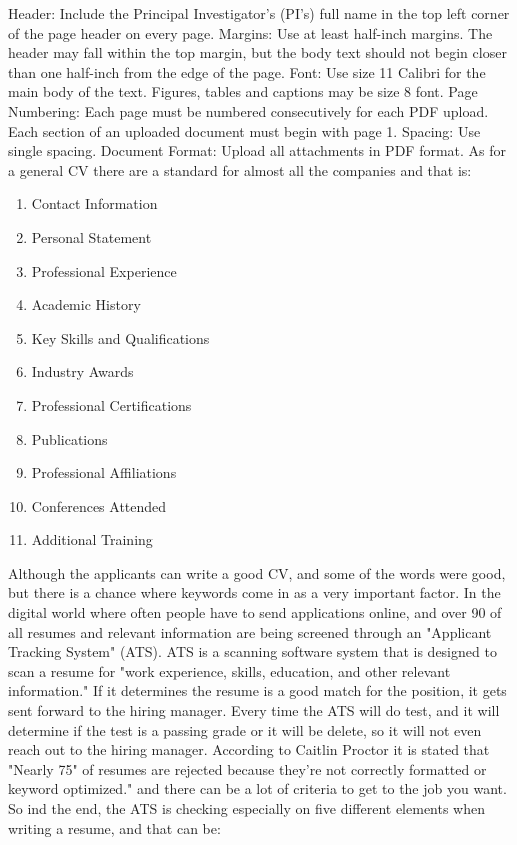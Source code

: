 Header: Include the Principal Investigator’s (PI’s) full name in the top left corner of the page header on every page.
Margins: Use at least half-inch margins. The header may fall within the top margin, but the body text should not begin closer than one half-inch from the edge of the page.
Font: Use size 11 Calibri for the main body of the text. Figures, tables and captions may be size 8 font.
Page Numbering: Each page must be numbered consecutively for each PDF upload. Each section of an uploaded document must begin with page 1.
Spacing: Use single spacing.
Document Format: Upload all attachments in PDF format.\cite{CV_for_PCori}
As for a general CV there are a standard for almost all the companies and that is:
\newpage
\begin{enumerate}

   \item Contact Information
   \item Personal Statement
   \item Professional Experience
   \item Academic History
   \item Key Skills and Qualifications
   \item Industry Awards
   \item Professional Certifications
   \item Publications
   \item Professional Affiliations
   \item Conferences Attended
   \item Additional Training\cite{Format_for_CV}
   \end{enumerate}

Although the applicants can write a good CV, and some of the words were good,
but there is a chance where keywords come in as a very important factor. In the digital world where often people have to send applications online, and over 90 %
of all resumes and relevant information are being screened through an "Applicant Tracking System" (ATS). ATS is a scanning software system
that is designed to scan a resume for "work experience, skills, education, and other relevant information."\cite{ATS}
If it determines the resume is a good match for the position, it gets sent forward to the hiring manager.
Every time the ATS will do test, and it will determine if the test is a passing grade or it will be delete, so it will not even reach out to the hiring manager.
According to Caitlin Proctor it is stated that "Nearly 75"
of resumes are rejected because they’re not correctly formatted or keyword optimized." and there can be a lot of criteria
to get to the job you want.\cite{ATS}
So ind the end, the ATS is checking especially on five different elements when writing a resume, and that can be:

